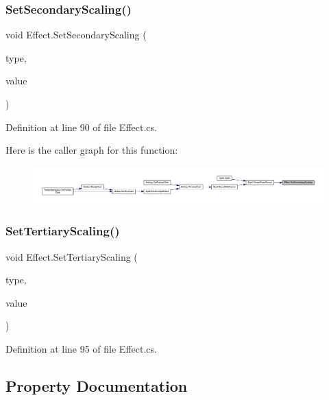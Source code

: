 \subsubsection{\texorpdfstring{SetSecondaryScaling()}{SetSecondaryScaling()}}
{\footnotesize\ttfamily void Effect.\+Set\+Secondary\+Scaling (\begin{DoxyParamCaption}\item[{\mbox{\hyperlink{class_effect_af0ada789de40f58c24c46bf8ed2f300c}{Scaling\+Type}}}]{type,  }\item[{float}]{value }\end{DoxyParamCaption})}



Definition at line 90 of file Effect.\+cs.

Here is the caller graph for this function\+:
\nopagebreak
\begin{figure}[H]
\begin{center}
\leavevmode
\includegraphics[width=350pt]{class_effect_a476b569a5adf97f1b691dcbb7e5cb325_icgraph}
\end{center}
\end{figure}
\mbox{\label{class_effect_a021b689f1ccd675bc1b6fefe3071253f}} 
\subsubsection{\texorpdfstring{SetTertiaryScaling()}{SetTertiaryScaling()}}
{\footnotesize\ttfamily void Effect.\+Set\+Tertiary\+Scaling (\begin{DoxyParamCaption}\item[{\mbox{\hyperlink{class_effect_af0ada789de40f58c24c46bf8ed2f300c}{Scaling\+Type}}}]{type,  }\item[{float}]{value }\end{DoxyParamCaption})}



Definition at line 95 of file Effect.\+cs.



\subsection{Property Documentation}
\mbox{\label{class_effect_abee804d3dd2ba5e3074d9fde9beedf07}} 

